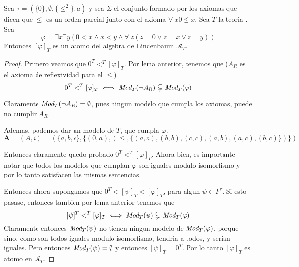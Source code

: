 \begin{remark}
  Sea $\tau = (\{0\},\emptyset,\{\leq^2\},a)$ y sea $\Sigma$ el conjunto formado por los axiomas
  que dicen que $\leq$ es un orden parcial junto con el axioma $\forall\ x 0\leq x$. Sea $T$
  la teoria \forder. Sea
  $$
  \varphi = \exists x \exists y (0 < x \land x < y \land \forall\ z (z = 0 \lor z = x \lor z = y))
  $$
  Entonces $[\varphi]_T$ es un atomo del algebra de Lindenbaum $\mathcal{A}_T$.
\end{remark}
\begin{proof}
  Primero veamos que $0^T <^T [\varphi]_T$. Por lema anterior, tenemos que ($A_R$ es el axioma de reflexividad para el $\leq$)
  $$0^T <^T [\varphi]_T \iff \emph{Mod}_T(\neg A_R)\subsetneqq\emph{Mod}_T(\varphi)$$

  Claramente $\emph{Mod}_T(\neg A_R) = \emptyset$, pues ningun modelo que cumpla los axiomas, puede no cumplir $A_R$.

  Ademas, podemos dar un modelo de $T$, que cumpla $\varphi$.
  $$
    \mathbf{A} = (A, i) = (\{a, b, c\}, \{(0, a), (\leq, \{(a,a),(b,b),(c,c),(a,b),(a,c),(b,c)\})\})
  $$

  Entonces claramente quedo probado $0^T <^T [\varphi]_T$. Ahora bien, es importante notar que todos los modelos que cumplan
  $\varphi$ son iguales modulo isomorfismo y por lo tanto satisfacen las mismas sentencias.

  Entonces ahora supongamos que $0^T < [\psi]_T < [\varphi]_T$, para algun $\psi \in F^\tau$. Si esto pasase, entonces 
  tambien por lema anterior tenemos que
  $$[\psi]^T <^T [\varphi]_T \iff \emph{Mod}_T(\psi)\subsetneqq\emph{Mod}_T(\varphi)$$
  Claramente entonces $\emph{Mod}_T(\psi)$ no tienen ningun modelo de $\emph{Mod}_T(\varphi)$, porque sino, como son todos iguales modulo
  isomorfismo, tendria a todos, y serian iguales. Pero entonces $\emph{Mod}_T(\psi) = \emptyset$ y entonces $[\psi]_T = 0^T$.
  Por lo tanto $[\varphi]_T$ es atomo en $\mathcal{A}_T$.
\end{proof}